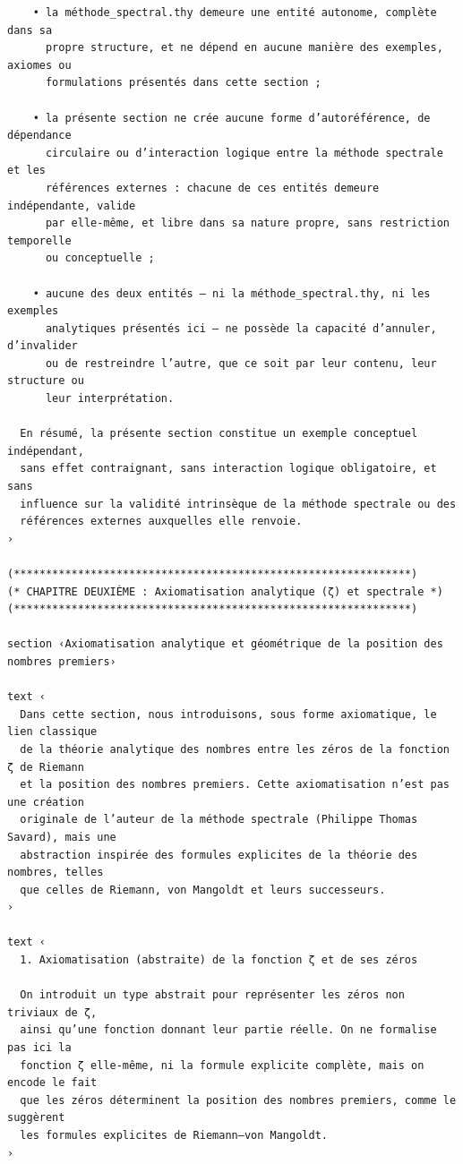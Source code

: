 \documentclass[a4paper,11pt]{article}
\begin{document}
\begin{holcode}[title={\textcolor{white}{File: methode\_spectral.thy -- Part 1/4}}]
\begin{lstlisting}
    • la méthode_spectral.thy demeure une entité autonome, complète dans sa
      propre structure, et ne dépend en aucune manière des exemples, axiomes ou
      formulations présentés dans cette section ;

    • la présente section ne crée aucune forme d’autoréférence, de dépendance
      circulaire ou d’interaction logique entre la méthode spectrale et les
      références externes : chacune de ces entités demeure indépendante, valide
      par elle-même, et libre dans sa nature propre, sans restriction temporelle
      ou conceptuelle ;

    • aucune des deux entités — ni la méthode_spectral.thy, ni les exemples
      analytiques présentés ici — ne possède la capacité d’annuler, d’invalider
      ou de restreindre l’autre, que ce soit par leur contenu, leur structure ou
      leur interprétation.

  En résumé, la présente section constitue un exemple conceptuel indépendant,
  sans effet contraignant, sans interaction logique obligatoire, et sans
  influence sur la validité intrinsèque de la méthode spectrale ou des
  références externes auxquelles elle renvoie.
›

(**************************************************************)
(* CHAPITRE DEUXIÈME : Axiomatisation analytique (ζ) et spectrale *)
(**************************************************************)

section ‹Axiomatisation analytique et géométrique de la position des nombres premiers›

text ‹
  Dans cette section, nous introduisons, sous forme axiomatique, le lien classique
  de la théorie analytique des nombres entre les zéros de la fonction ζ de Riemann
  et la position des nombres premiers. Cette axiomatisation n’est pas une création
  originale de l’auteur de la méthode spectrale (Philippe Thomas Savard), mais une
  abstraction inspirée des formules explicites de la théorie des nombres, telles
  que celles de Riemann, von Mangoldt et leurs successeurs.
›

text ‹
  1. Axiomatisation (abstraite) de la fonction ζ et de ses zéros

  On introduit un type abstrait pour représenter les zéros non triviaux de ζ,
  ainsi qu’une fonction donnant leur partie réelle. On ne formalise pas ici la
  fonction ζ elle-même, ni la formule explicite complète, mais on encode le fait
  que les zéros déterminent la position des nombres premiers, comme le suggèrent
  les formules explicites de Riemann–von Mangoldt.
›


\end{lstlisting}
\end{holcode}
\end{document}

